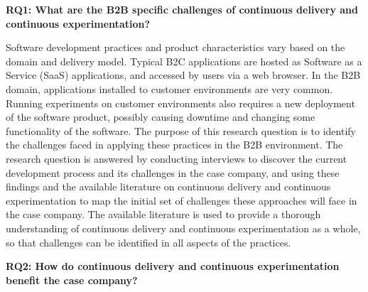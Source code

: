 \documentclass[english, grading]{tktltiki2}
\theoremstyle{definition}
\theoremstyle{remark}
\begin{document}
\noindent \textbf{RQ1: What are the B2B specific challenges of continuous delivery and continuous experimentation?}

\noindent Software development practices and product characteristics vary based on the domain and delivery model. Typical B2C applications are hosted as Software as a Service (SaaS) applications, and accessed by users via a web browser. In the B2B domain, applications installed to customer environments are very common. Running experiments on customer environments also requires a new deployment of the software product, possibly causing downtime and changing some functionality of the software. The purpose of this research question is to identify the challenges faced in applying these practices in the B2B environment. The research question is answered by conducting interviews to discover the current development process and its challenges in the case company, and using these findings and the available literature on continuous delivery and continuous experimentation to map the initial set of challenges these approaches will face in the case company. The available literature is used to provide a thorough understanding of continuous delivery and continuous experimentation as a whole, so that challenges can be identified in all aspects of the practices.
\newline




\noindent \textbf{RQ2: How do continuous delivery and continuous experimentation benefit the case company?} %
\end{document}
